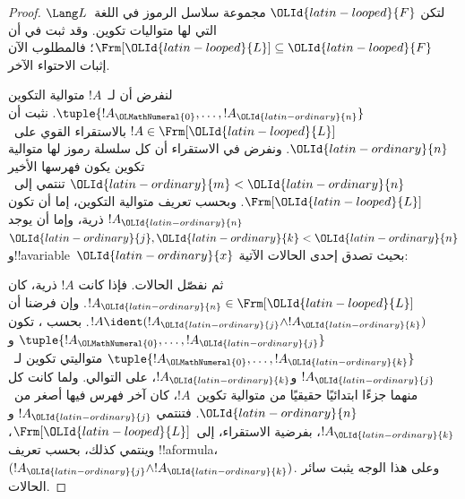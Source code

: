 \documentclass[../../../include/open-logic-section]{subfiles}
\begin{document}
\begin{proof}
لتكن ${\OLId{latin-looped}{F}}$ مجموعة سلاسل الرموز في اللغة~$\Lang L$ التي لها
متواليات تكوين. وقد ثبت في
 أن $\Frm[{\OLId{latin-looped}{L}}] \subseteq {\OLId{latin-looped}{F}}$؛
فالمطلوب الآن إثبات الاحتواء الآخر.

لنفرض أن لـ~$!A$ متوالية التكوين
$\tuple{!A_{\OLMathNumeral{0}},\dotsc,!A_{\OLId{latin-ordinary}{n}}}$. نثبت أن $!A \in \Frm[{\OLId{latin-looped}{L}}]$ بالاستقراء
القوي على~${\OLId{latin-ordinary}{n}}$. ونفرض في الاستقراء أن كل سلسلة رموز لها متوالية
تكوين يكون فهرسها الأخير ${\OLId{latin-ordinary}{m}} < {\OLId{latin-ordinary}{n}}$ تنتمي إلى~$\Frm[{\OLId{latin-looped}{L}}]$. وبحسب تعريف
متوالية التكوين، إما أن تكون $!A_{\OLId{latin-ordinary}{n}}$ ذرية، وإما أن يوجد ${\OLId{latin-ordinary}{j}},{\OLId{latin-ordinary}{k}} < {\OLId{latin-ordinary}{n}}$
و!!a{variable}~${\OLId{latin-ordinary}{x}}$ بحيث تصدق إحدى الحالات الآتية:
\begin{enumerate}
\end{enumerate}
ثم نفصّل الحالات. فإذا كانت $!A$ ذرية، كان
$!A_{\OLId{latin-ordinary}{n}} \in \Frm[{\OLId{latin-looped}{L}}]$. وإن فرضنا أن
$!A \ident (!A_{\OLId{latin-ordinary}{j}} \land !A_{\OLId{latin-ordinary}{k}})$. بحسب
،
تكون $\tuple{!A_{\OLMathNumeral{0}},\dotsc,!A_{\OLId{latin-ordinary}{j}}}$ و$\tuple{!A_{\OLMathNumeral{0}},\dotsc,!A_{\OLId{latin-ordinary}{k}}}$
متواليتي تكوين لـ~$!A_{\OLId{latin-ordinary}{j}}$ و$!A_{\OLId{latin-ordinary}{k}}$، على التوالي. ولما كانت كل منهما جزءًا ابتدائيًا حقيقيًا من متوالية تكوين~$!A$،
كان آخر فهرس فيها أصغر من~${\OLId{latin-ordinary}{n}}$. فتنتمي $!A_{\OLId{latin-ordinary}{j}}$ و$!A_{\OLId{latin-ordinary}{k}}$، بفرضية
الاستقراء، إلى~$\Frm[{\OLId{latin-looped}{L}}]$، وينتمي كذلك، بحسب تعريف !!a{formula}،
$(!A_{\OLId{latin-ordinary}{j}} \land !A_{\OLId{latin-ordinary}{k}})$. وعلى هذا الوجه يثبت سائر الحالات.
\end{proof}
\end{document}
